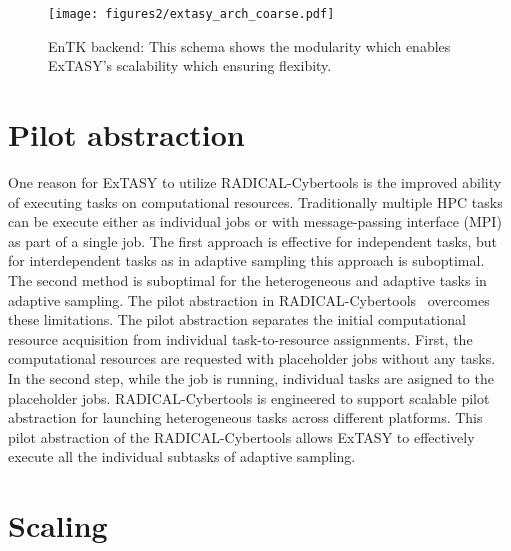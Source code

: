 {\begin{figure}[H]
 \centering
  \texttt{[image: figures2/extasy\_arch\_coarse.pdf]}
  \caption{EnTK backend: This schema shows the modularity which enables ExTASY's scalability which ensuring flexibity.  
  }\label{fig:extasy_arch}
\end{figure}


\section{Pilot abstraction} 
One reason for ExTASY to utilize RADICAL-Cybertools is the improved ability of executing tasks on computational resources. Traditionally multiple HPC tasks can be execute either as individual jobs or with message-passing interface (MPI) as part of a single job. The first approach is effective for independent tasks, but for interdependent tasks as in adaptive sampling this approach is suboptimal. The second method is suboptimal for the heterogeneous and adaptive tasks in adaptive sampling. The pilot abstraction in RADICAL-Cybertools~\cite{turilli2018comprehensive} overcomes these limitations.  The pilot abstraction separates the initial computational resource acquisition from individual task-to-resource assignments. First, the computational resources are requested with placeholder jobs without any tasks. In the second step, while the job is running, individual tasks are asigned to the placeholder jobs. RADICAL-Cybertools is engineered to support scalable pilot abstraction for launching heterogeneous tasks across different platforms. This pilot abstraction of the RADICAL-Cybertools allows ExTASY to effectively execute all the individual subtasks of adaptive sampling.  

\section{\label{sec:scaling}Scaling}


}

